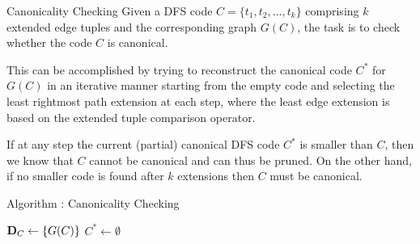 \begin{frame}{Canonicality Checking}
Given a DFS code $C
= \{t_1, t_2, \ldots, t_k\}$ comprising $k$ extended edge tuples
and the corresponding graph $G(C)$, the task is to check whether
the code $C$ is canonical. 

\medskip
This can be accomplished by trying to
reconstruct the canonical code $C^*$ for $G(C)$ in an iterative
manner starting from the empty code and selecting the least
rightmost path extension at each step, where the least edge
extension is based on the extended tuple comparison operator.

\medskip
If at any step the current
(partial) canonical DFS code $C^*$ is smaller than $C$, then we
know that $C$ cannot be canonical and can thus be pruned. On the
other hand, if no smaller code is found after $k$ extensions then
$C$ must be canonical. 
\end{frame}



\begin{frame}[fragile]{Algorithm \algcanonical: Canonicality Checking}
\begin{algorithm}[H]
  \iscanonical{}
  $\mathbf{D}_C \gets \{G(C)\}$ 
  $C^* \gets \emptyset$ 
   
\end{algorithm}
\end{frame}



